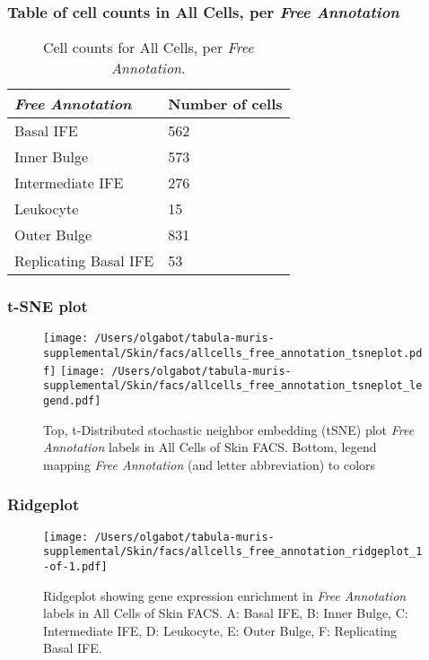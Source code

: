 \subsubsection{Table of cell counts in All Cells, per \emph{Free Annotation}}\begin{table}[h]
\centering
\label{my-label}
\begin{tabular}{@{}ll@{}}
\toprule

\emph{Free Annotation}& Number of cells \\ \midrule
Basal IFE & 562 \\

Inner Bulge & 573 \\

Intermediate IFE & 276 \\

Leukocyte & 15 \\

Outer Bulge & 831 \\

Replicating Basal IFE & 53 \\
\bottomrule
\end{tabular}
\caption{Cell counts for All Cells, per \emph{Free Annotation}.}
\end{table}

\clearpage
\subsubsection{t-SNE plot}
\begin{figure}[h]
\centering
\texttt{[image: /Users/olgabot/tabula-muris-supplemental/Skin/facs/allcells\_free\_annotation\_tsneplot.pdf]}
\texttt{[image: /Users/olgabot/tabula-muris-supplemental/Skin/facs/allcells\_free\_annotation\_tsneplot\_legend.pdf]}
\caption{Top, t-Distributed stochastic neighbor embedding (tSNE) plot  \emph{Free Annotation} labels in All Cells of Skin FACS. Bottom, legend mapping \emph{Free Annotation} (and letter abbreviation) to colors}
\end{figure}


\clearpage

\subsubsection{Ridgeplot}
\begin{figure}[h]
\centering
\texttt{[image: /Users/olgabot/tabula-muris-supplemental/Skin/facs/allcells\_free\_annotation\_ridgeplot\_1-of-1.pdf]}

\caption{ Ridgeplot  showing gene expression enrichment in \emph{Free Annotation} labels in All Cells of Skin FACS. A: Basal IFE, B: Inner Bulge, C: Intermediate IFE, D: Leukocyte, E: Outer Bulge, F: Replicating Basal IFE.}
\end{figure}


